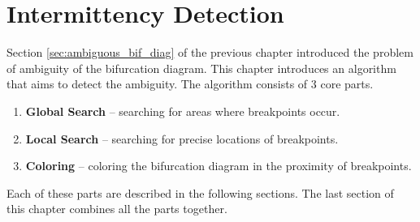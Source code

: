 \chapter{Intermittency Detection}
Section \ref{sec:ambiguous_bif_diag} of the previous chapter introduced the problem of ambiguity of the bifurcation diagram.
This chapter introduces an algorithm that aims to detect the ambiguity.
The algorithm consists of 3 core parts.


\begin{enumerate}
	\item \textbf{Global Search} -- searching for areas where breakpoints occur.
	\item \textbf{Local Search} -- searching for precise locations of breakpoints.
	\item \textbf{Coloring} -- coloring the bifurcation diagram in the proximity of breakpoints.
\end{enumerate}

Each of these parts are described in the following sections.
The last section of this chapter combines all the parts together.

